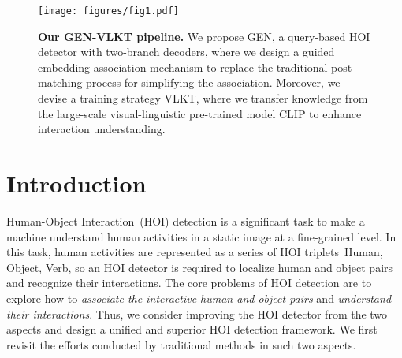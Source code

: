 \documentclass[10pt,twocolumn,letterpaper]{article}
\begin{document}
\begin{figure}[h]
  \centering
  \texttt{[image: figures/fig1.pdf]}
  \vspace{-4.5mm}
  \caption{\textbf{Our GEN-VLKT pipeline.} We propose GEN, a query-based HOI detector with two-branch decoders, where we design a guided embedding association mechanism to replace the traditional post-matching process for simplifying the association. Moreover, we devise a training strategy VLKT, where we transfer knowledge from the large-scale visual-linguistic pre-trained model CLIP to enhance interaction understanding.}
  \label{fig:first}
   \vspace{-3mm}
\end{figure}

\vspace{-4mm}\section{Introduction}
\vspace{-1.5mm}
\label{sec:intro}


Human-Object Interaction~(HOI) detection is a significant task to make a machine understand human activities in a static image at a fine-grained level. In this task, human activities are represented as a series of HOI triplets~Human, Object, Verb, so an HOI detector is required to localize human and object pairs and recognize their interactions. The core problems of HOI detection are to explore how to \emph{associate the interactive human and object pairs} and \emph{understand their interactions}. Thus, we consider improving the HOI detector from the two aspects and design a unified and superior HOI detection framework. We first revisit the efforts conducted by traditional methods in such two aspects.
\end{document}
